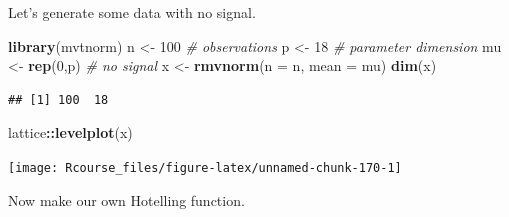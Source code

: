 \documentclass[]{book}
\newenvironment{Shaded}{\begin{snugshade}}{\end{snugshade}}
\newcommand{\KeywordTok}[1]{\textcolor[rgb]{0.13,0.29,0.53}{\textbf{#1}}}
\newcommand{\DataTypeTok}[1]{\textcolor[rgb]{0.13,0.29,0.53}{#1}}
\newcommand{\DecValTok}[1]{\textcolor[rgb]{0.00,0.00,0.81}{#1}}
\newcommand{\StringTok}[1]{\textcolor[rgb]{0.31,0.60,0.02}{#1}}
\newcommand{\CommentTok}[1]{\textcolor[rgb]{0.56,0.35,0.01}{\textit{#1}}}
\newcommand{\OtherTok}[1]{\textcolor[rgb]{0.56,0.35,0.01}{#1}}
\newcommand{\ControlFlowTok}[1]{\textcolor[rgb]{0.13,0.29,0.53}{\textbf{#1}}}
\newcommand{\OperatorTok}[1]{\textcolor[rgb]{0.81,0.36,0.00}{\textbf{#1}}}
\newcommand{\NormalTok}[1]{#1}
\theoremstyle{definition}
\theoremstyle{definition}
\theoremstyle{definition}
\theoremstyle{remark}
\begin{document}
Let's generate some data with no signal.

\begin{Shaded}
\begin{Highlighting}[]
\KeywordTok{library}\NormalTok{(mvtnorm)}
\NormalTok{n <-}\StringTok{ }\DecValTok{100} \CommentTok{# observations}
\NormalTok{p <-}\StringTok{ }\DecValTok{18} \CommentTok{# parameter dimension}
\NormalTok{mu <-}\StringTok{ }\KeywordTok{rep}\NormalTok{(}\DecValTok{0}\NormalTok{,p) }\CommentTok{# no signal}
\NormalTok{x <-}\StringTok{ }\KeywordTok{rmvnorm}\NormalTok{(}\DataTypeTok{n =}\NormalTok{ n, }\DataTypeTok{mean =}\NormalTok{ mu)}
\KeywordTok{dim}\NormalTok{(x)}
\end{Highlighting}
\end{Shaded}

\begin{verbatim}
## [1] 100  18
\end{verbatim}

\begin{Shaded}
\begin{Highlighting}[]
\NormalTok{lattice}\OperatorTok{::}\KeywordTok{levelplot}\NormalTok{(x)}
\end{Highlighting}
\end{Shaded}

\texttt{[image: Rcourse\_files/figure-latex/unnamed-chunk-170-1]}

Now make our own Hotelling function.

\begin{Shaded}
\end{Shaded}
\end{document}
